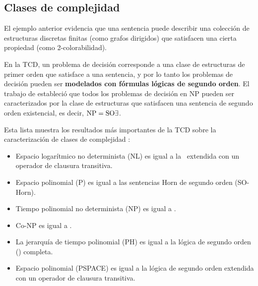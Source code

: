 \subsection{Clases de complejidad}
El ejemplo anterior evidencia que una sentencia puede describir una colección
de estructuras discretas finitas (como grafos dirigidos) que satisfacen
una cierta propiedad (como 2-colorabilidad). 

En la TCD, un problema de decisión corresponde a una clase de estructuras de
primer orden que satisface a una sentencia, y por lo tanto los problemas de
decisión pueden ser \textbf{modelados con fórmulas lógicas de segundo orden}.
El trabajo de \cite{fagin:spectra} estableció que todos los problemas de
decisión en NP pueden ser caracterizados por la clase de estructuras que
satisfacen una sentencia de segundo orden existencial, es decir,
$\text{NP}=\text{SO}\exists$.

Esta lista muestra los resultados más importantes de la TCD sobre la
caracterización de clases de complejidad \citep{immerman:book}:
\begin{itemize}
\item Espacio logarítmico no determinista (NL) es igual a la \LPO\ extendida con
un operador de clausura transitiva.
\item Espacio polinomial (P) es igual a las sentencias Horn de segundo orden
(SO-Horn).
\item Tiempo polinomial no determinista (NP) es igual a \SOE.
\item Co-NP es igual a \SOA.
\item La jerarquía de tiempo polinomial (PH) es igual a la lógica 
de segundo orden (\LSO) completa.
\item Espacio polinomial (PSPACE) es igual a la lógica de segundo orden
extendida con un operador de clausura transitiva.
\end{itemize}


